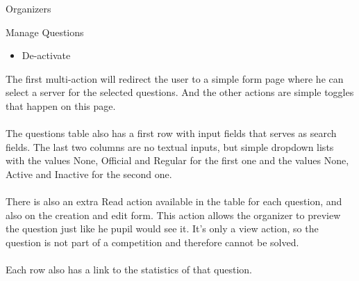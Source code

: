 \begin{section}{Organizers}
\begin{subsection}{Manage Questions}
\begin{itemize}
			\item De-activate
		\end{itemize}
		The first multi-action will redirect the user to a simple form page where he can
		select a server for the selected questions. And the other actions are simple
		toggles that happen on this page.\\
		\\
		The questions table also has a first row with input fields that serves as
		search fields. The last two columns are no textual inputs, but simple dropdown
		lists with the values None, Official and Regular for the first one and the
		values None, Active and Inactive for the second one.\\
		\\
		There is also an extra Read action available in the table for each question, and
		also on the creation and edit form. This action allows the organizer to preview
		the question just like he pupil would see it. It's only a view action, so the
		question is not part of a competition and therefore cannot be solved. \\
		\\
		Each row also has a link to the statistics of that question.
	\end{subsection}
	

\end{section}
